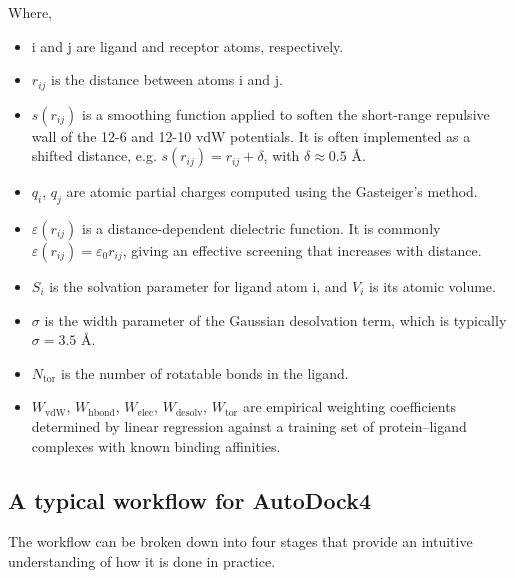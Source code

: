 \documentclass[12pt]{article}
\begin{document}
Where,
\begin{itemize}
  \item i and j are ligand and receptor atoms, respectively.
  \item $r_{ij}$ is the distance between atoms i  and j.
  \item $s(r_{ij})$ is a smoothing function applied to soften the short-range repulsive wall of the 12-6 and 12-10 vdW potentials. It is often implemented as a shifted distance, e.g. $ s(r_{ij}) = r_{ij} + \delta $, with $ \delta \approx 0.5 $ \r{A}.
  \item $ q_i$, $q_j$ are atomic partial charges computed using the Gasteiger's method\cite{CH7_gasteiger}.
  \item $ \varepsilon(r_{ij})$ is a distance-dependent dielectric function. It is commonly $ \varepsilon(r_{ij}) = \varepsilon_0 r_{ij} $, giving an effective screening that increases with distance.
  \item $S_i$ is the solvation parameter for ligand atom i, and $V_i$ is its atomic volume.
  \item $\sigma$ is the width parameter of the Gaussian desolvation term, which is typically $\sigma = 3.5$ \r{A}.
  \item $ N_{\textrm{tor}}$ is the number of rotatable bonds in the ligand.
  \item $ W_{\textrm{vdW}}$, $W_{\textrm{hbond}}$, $W_{\textrm{elec}}$, $W_{\textrm{desolv}}$, $W_{\textrm{tor}}$ are empirical weighting coefficients determined by linear regression against a training set of protein--ligand complexes with known binding affinities. 
\end{itemize}


\subsection{A typical workflow for AutoDock4}

The workflow can be broken down into four stages that provide an intuitive understanding of how it is done in practice.
\end{document}
